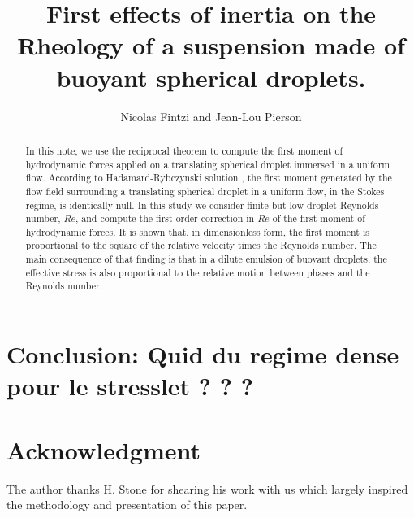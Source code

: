 \documentclass[12pt]{My_preprint}
\title{
    First effects of inertia on the Rheology of a suspension made of buoyant spherical droplets.  
    }
\author[1,2]{Nicolas Fintzi and  Jean-Lou Pierson}
\begin{document}
\maketitle

\begin{abstract}
    In this note, we use the reciprocal theorem to compute the first moment of hydrodynamic forces applied on a translating spherical droplet immersed in a uniform flow. 
    According to Hadamard-Rybczynski solution \citep{kim2013microhydrodynamics}, the first moment generated by the flow field surrounding a translating spherical droplet in a uniform flow, in the Stokes regime, is identically null. 
    In this study we consider finite but low droplet Reynolds number, $Re$, and compute the first order correction in $Re$ of the first moment of hydrodynamic forces. 
    It is shown that, in dimensionless form, the first moment is proportional to the square of the relative velocity times the Reynolds number.  
    The main consequence of that finding is that in a dilute emulsion of buoyant droplets, the effective stress is also proportional to the relative motion between phases and the Reynolds number. 
\end{abstract}









\section{Conclusion: Quid du regime dense pour le stresslet ? ? ? }
\section*{Acknowledgment}

The author thanks H. Stone for shearing his work with us \citep{stone2001inertial} which largely inspired the methodology and presentation of this paper. 



\appendix


\end{document}
